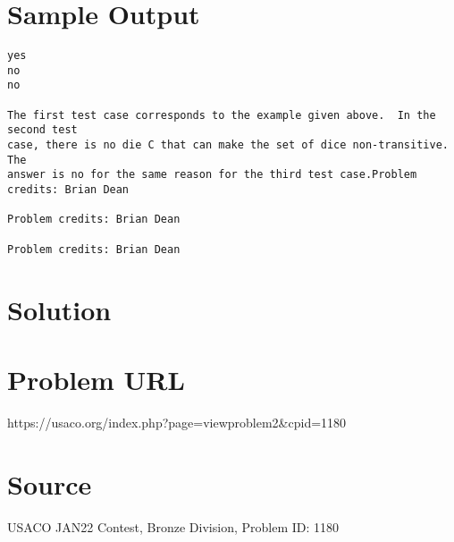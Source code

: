 \documentclass[12pt]{article}
\begin{document}
\section*{Sample Output}
\begin{verbatim}
yes
no
no

The first test case corresponds to the example given above.  In the second test
case, there is no die C that can make the set of dice non-transitive.  The
answer is no for the same reason for the third test case.Problem credits: Brian Dean

Problem credits: Brian Dean

Problem credits: Brian Dean
\end{verbatim}

\section*{Solution}


\section*{Problem URL}
https://usaco.org/index.php?page=viewproblem2&cpid=1180

\section*{Source}
USACO JAN22 Contest, Bronze Division, Problem ID: 1180
\end{document}

